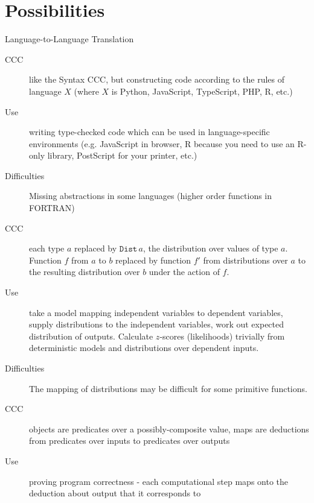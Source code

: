 \documentclass[10pt]{beamer}
\newcommand{\Dist}[1]{\ensuremath{\mathtt{Dist}\,#1}}
\theoremstyle{definition}
\theoremstyle{remark}
\numberwithin{equation}{section}
\begin{document}
\section{Possibilities} %

\begin{frame}[fragile]{Language-to-Language Translation}
  \begin{description}
  \item[CCC] like the Syntax CCC, but constructing code according to the rules of language $X$ (where $X$ is Python, JavaScript, TypeScript, PHP, R, etc.)
  \item[Use] writing type-checked code which can be used in language-specific environments (e.g. JavaScript in browser, R because you need to use an R-only library, PostScript for your printer, etc.)
  \item[Difficulties] Missing abstractions in some languages (higher order functions in FORTRAN)
  \end{description}
\end{frame}

\begin{frame}[fragile]{}
  \begin{description}
  \item[CCC] each type $a$ replaced by $\Dist{a}$, the distribution over values of type $a$. Function $f$ from $a$ to $b$ replaced by function $f'$ from distributions over $a$ to the resulting distribution over $b$ under the action of $f$.
  \item[Use] take a model mapping independent variables to dependent variables, supply distributions to the independent variables, work out expected distribution of outputs. Calculate $z$-scores (likelihoods) trivially from deterministic models and distributions over dependent inputs.
  \item[Difficulties] The mapping of distributions may be difficult for some primitive functions.
  \end{description}
\end{frame}

\begin{frame}[fragile]{}
  \begin{description}
  \item[CCC] objects are predicates over a possibly-composite value, maps are deductions from predicates over inputs to predicates over outputs
  \item[Use] proving program correctness - each computational step maps onto the deduction about output that it corresponds to
  \end{description}
\end{frame}
\end{document}
